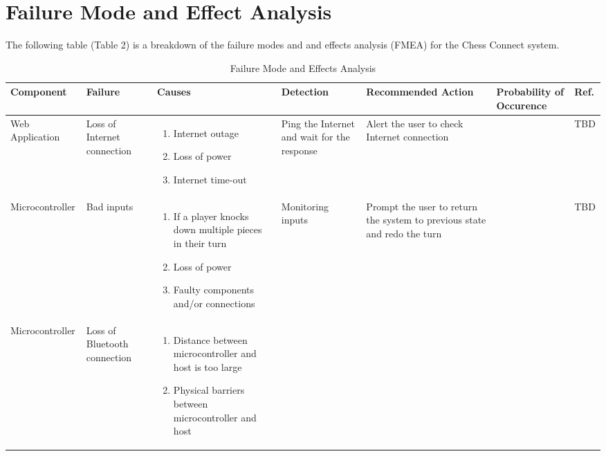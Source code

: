 \documentclass{article}
\begin{document}
\section{Failure Mode and Effect Analysis}
{The following table (Table 2) is a breakdown of the failure modes and and effects analysis (FMEA) for the Chess Connect system.}
\begin{table}[!htbp]
    \caption{Failure Mode and Effects Analysis}
    \centering
        \setlength{\leftmargini}{0.4cm}
        \begin{tabular}{| >{\centering\arraybackslash}m{2.5cm} | 
          >{\centering\arraybackslash}m{2cm} | 
          >{\centering\arraybackslash}m{3cm} |
          >{\centering\arraybackslash}m{2cm} |
          >{\centering\arraybackslash}m{3cm} |
          >{\centering\arraybackslash}m{1.5cm} |
          >{\centering\arraybackslash}m{1cm} |}
        \hline
        \rowcolor[gray]{0.9}
        Component & Failure & Causes & Detection & Recommended Action & Probability of Occurence & Ref. \\
        \hline
        Web Application & Loss of Internet connection
        & \begin{enumerate}[label=(\alph*)]
            \item Internet outage 
            \item Loss of power
            \item Internet time-out 
        \end{enumerate} & Ping the Internet and wait for the response & Alert the user to check Internet connection & 0.3 & TBD \\
        \hline
        Microcontroller & Bad inputs &
        \begin{enumerate}[label=(\alph*)]
            \item If a player knocks down multiple pieces in their turn 
            \item Loss of power
            \item Faulty components and/or connections 
        \end{enumerate} & Monitoring inputs & Prompt the user to return the system to previous state and redo the turn & 0.4 & TBD \\ 
        \hline
        Microcontroller & Loss of Bluetooth connection & \begin{enumerate}[label=(\alph*)]
            \item Distance between microcontroller and host is too large
            \item Physical barriers between microcontroller and host

\end{enumerate}
\end{tabular}
\end{table}
\end{document}
